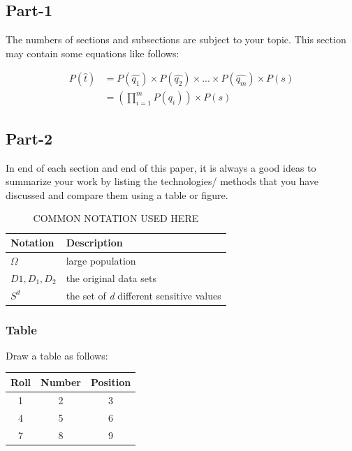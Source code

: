 \documentclass[conference]{sig-alternate}
\begin{document}
\subsection{Part-1}
The numbers of sections and subsections are subject to your topic. This section may contain some equations like follows:

\begin{align}
	P(\hat{t}) &= P(\hat{q_1})\times P(\hat{q_{2}})\times ...\times P(\hat{q_{m}})\times P(s) \nonumber \\
&= (\prod_{i=1}^{m} P(\hat{q_{i}}))\times P(s)
\end{align}

\subsection{Part-2}
In end of each section and end of this paper, it is always a
good ideas to summarize your work by listing the technologies/
methods that you have discussed and compare them using
a table or figure.

\begin{table}[h]
\begin{center}
	\caption{COMMON NOTATION USED HERE}
	\label{notation}
	\begin{tabular}{ |l|l| } 
		\hline
		\textbf{Notation} & \textbf{Description}  \\ 
		\hline
		$\Omega$ & large population \\
		\hline 
		$D1, D_{1}, D_{2}$ & the original data sets\\
		\hline
		$ S^{d} $ & the set of \textit{d} different sensitive values\\
		\hline
		
	\end{tabular}
\end{center}
\end{table}

\vfill\null


\subsubsection{Table}
Draw a table as follows:
\begin{table}[h]
	\begin{center}
		\begin{tabular}{c|c|c}
			\hline
			Roll & Number & Position\\
			\hline
			1 & 2 & 3\\
			\hline
			4 & 5 & 6\\
			\hline
			7 & 8 & 9\\
			\hline
		\end{tabular}
	\end{center}
\end{table}
\end{document}
